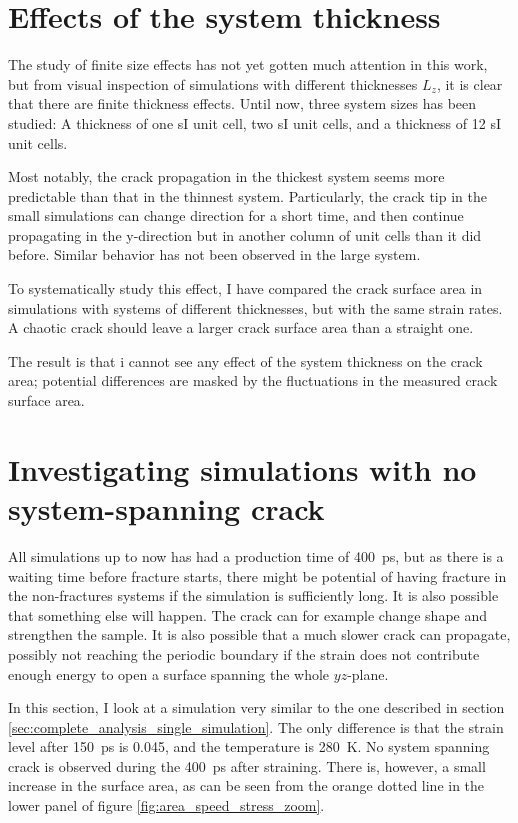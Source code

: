\section{Effects of the system thickness}
The study of finite size effects has not yet gotten much attention in this work, but from visual inspection of simulations with different thicknesses $L_z$, it is clear that there are finite thickness effects. Until now, three system sizes has been studied: A thickness of one sI unit cell, two sI unit cells, and a thickness of 12 sI unit cells. 

Most notably, the crack propagation in the thickest system seems more predictable than that in the thinnest system. Particularly, the crack tip in the small simulations can change direction for a short time, and then continue propagating in the y-direction but in another column of unit cells than it did before. Similar behavior has not been observed in the large system.

To systematically study this effect, I have compared the crack surface area in simulations with systems of different thicknesses, but with the same strain rates. A chaotic crack should leave a larger crack surface area than a straight one.

The result is that i cannot see any effect of the system thickness on the crack area; potential differences are masked by the fluctuations in the measured crack surface area.

\section{Investigating simulations with no system-spanning crack}
All simulations up to now has had a production time of \SI{400}{\pico\second}, but as there is a waiting time before fracture starts, there might be potential of having fracture in the non-fractures systems if the simulation is sufficiently long. It is also possible that something else will happen. The crack can for example change shape and strengthen the sample. It is also possible that a much slower crack can propagate, possibly not reaching the periodic boundary if the strain does not contribute enough energy to open a surface spanning the whole $yz$-plane. 

In this section, I look at a simulation very similar to the one described in section \ref{sec:complete_analysis_single_simulation}. The only difference is that the strain level after \SI{150}{\pico\second} is 0.045, and the temperature is \SI{280}{\kelvin}. No system spanning crack is observed during the \SI{400}{\pico\second} after straining. There is, however, a small increase in the surface area, as can be seen from the orange dotted line in the lower panel of figure \ref{fig:area_speed_stress_zoom}.

